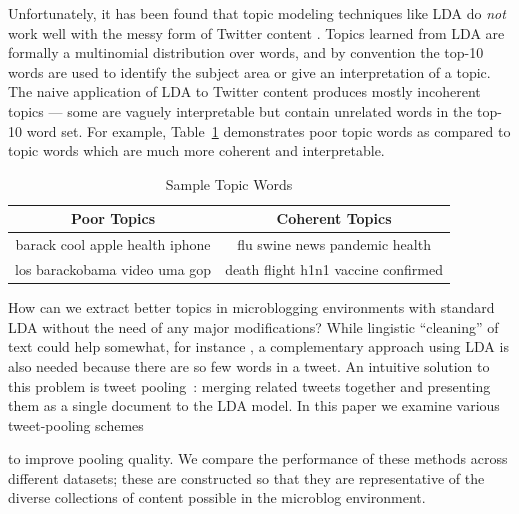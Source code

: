 \documentclass{sig-alternate}
\begin{document}
Unfortunately, it has been found that topic modeling techniques like
LDA do \emph{not} work well with the messy form of Twitter content
\cite{wayne}.  Topics learned from LDA are formally a multinomial
distribution over words, and by convention the top-10 words are used
to identify the subject area or give an interpretation of a topic.
The naive application of LDA to Twitter content produces mostly
incoherent topics --- some are vaguely interpretable but contain
unrelated words in the top-10 word set.  For example,
Table~\ref{tbl-0} demonstrates poor topic words as compared to topic
words which are much more coherent and interpretable.
\begin{table}%
\centering
\caption{Sample Topic Words}\label{tbl-0}
\resizebox{8.5cm}{!} 
{
	\begin{tabular}{|c|c|}
	\hline
        Poor Topics  & Coherent Topics \\
\hline
 {\small barack cool apple health iphone}
 &
 {\small flu swine news pandemic health}\\
 {\small los barackobama video uma gop} & {\small death flight h1n1 vaccine confirmed} \\
 \hline
	\end{tabular}
}\vspace*{-10pt}
\end{table}

How can we extract better topics in
microblogging environments with standard LDA without the need of any
major modifications?  
While lingistic ``cleaning'' of text could help somewhat,
for instance  \cite{Han2012},  a complementary approach 
using LDA is also needed because there are so few words in a tweet.
An intuitive solution to this problem is tweet
pooling~\cite{Weng2010wsdm,hong}: merging related tweets together and presenting them as a single document to the LDA model.  
In this paper we examine various tweet-pooling schemes to improve pooling quality.  We compare
the performance of these methods across different datasets; these are
constructed so that they are representative of the diverse collections
of content possible in the microblog environment.  
\end{document}

